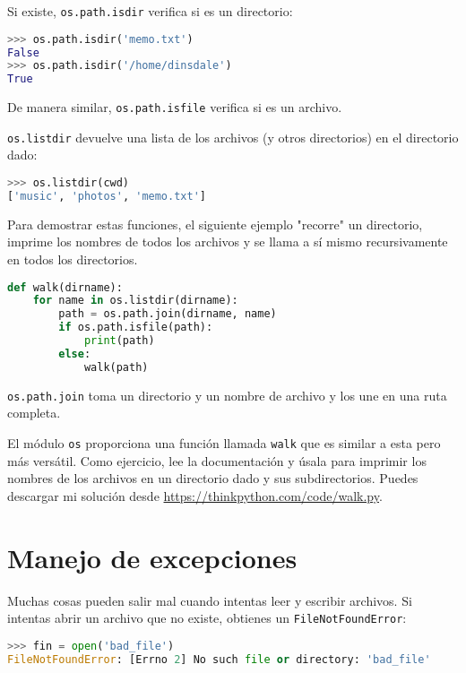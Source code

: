 Si existe, \texttt{os.path.isdir} verifica si es un directorio:

\begin{lstlisting}[language=Python]
>>> os.path.isdir('memo.txt')
False
>>> os.path.isdir('/home/dinsdale')
True
\end{lstlisting}

De manera similar, \texttt{os.path.isfile} verifica si es un archivo.

\texttt{os.listdir} devuelve una lista de los archivos (y otros directorios) en el directorio dado:

\begin{lstlisting}[language=Python]
>>> os.listdir(cwd)
['music', 'photos', 'memo.txt']
\end{lstlisting}

Para demostrar estas funciones, el siguiente ejemplo "recorre" un directorio, imprime los nombres de todos los archivos y se llama a sí mismo recursivamente en todos los directorios.

\begin{lstlisting}[language=Python]
def walk(dirname):
    for name in os.listdir(dirname):
        path = os.path.join(dirname, name)
        if os.path.isfile(path):
            print(path)
        else:
            walk(path)
\end{lstlisting}

\texttt{os.path.join} toma un directorio y un nombre de archivo y los une en una ruta completa.

El módulo \texttt{os} proporciona una función llamada \texttt{walk} que es similar a esta pero más versátil. Como ejercicio, lee la documentación y úsala para imprimir los nombres de los archivos en un directorio dado y sus subdirectorios. Puedes descargar mi solución desde \url{https://thinkpython.com/code/walk.py}.

\section{Manejo de excepciones}

Muchas cosas pueden salir mal cuando intentas leer y escribir archivos. Si intentas abrir un archivo que no existe, obtienes un \texttt{FileNotFoundError}:

\begin{lstlisting}[language=Python]
>>> fin = open('bad_file')
FileNotFoundError: [Errno 2] No such file or directory: 'bad_file'
\end{lstlisting}

